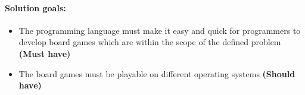 \paragraph*{Solution goals:}
\begin{itemize}[noitemsep]
\item The programming language must make it easy and quick for programmers to develop board games which are within the scope of the defined problem \textbf{(Must have)}
\item The board games must be playable on different operating systems \textbf{(Should have)}
\end{itemize}